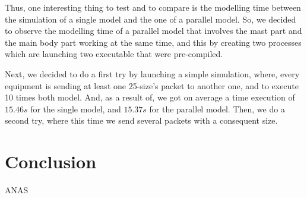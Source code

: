 \documentclass[12pt,a4paper]{article}
\begin{document}
Thus, one interesting thing to test and to compare is the modelling time between the simulation of a single model and the one of a parallel model. So, we decided to observe the modelling time of a parallel model that involves the mast part and the main body part working at the same time, and this by creating two processes which are launching two executable that were pre-compiled.\smallbreak

Next, we decided to do a first try by launching a simple simulation, where, every equipment is sending at least one 25-size's packet to another one, and to execute 10 times both model. And, as a result of, we got on average a time execution of $15.46 s$ for the single model, and $15.37 s$ for the parallel model. Then, we do a second try, where this time we send several packets with a consequent size.\smallbreak

\pagebreak

\section{Conclusion}

ANAS

\pagebreak
\nocite{*}


\end{document}
